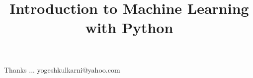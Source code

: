 \documentclass[xcolor=dvipsnames,compress,t,pdf,9pt]{beamer}
\title[\insertframenumber /\inserttotalframenumber]{Introduction to Machine Learning with Python}
\begin{document}
	\begin{frame}
	\titlepage
	\end{frame}
	
%	
	
	
	\begin{frame}[c]{}
	Thanks ...
	\vspace{5mm}
	yogeshkulkarni@yahoo.com
	\end{frame}
\end{document}
